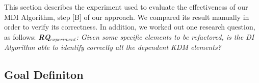 
This section describes the experiment used to evaluate the effectiveness of our MDI Algorithm, step [B] of our approach. We compared its result manually in order to verify its correctness. %
In addition, we worked out one research question, as follows:
%
%
\textit{\textbf{RQ$_{experiment}$}: Given some specific elements to be refactored, is the DI Algorithm able to identify correctly all the dependent KDM elements?}

 

\subsection{Goal Definiton}\label{sec:goal_definition}

